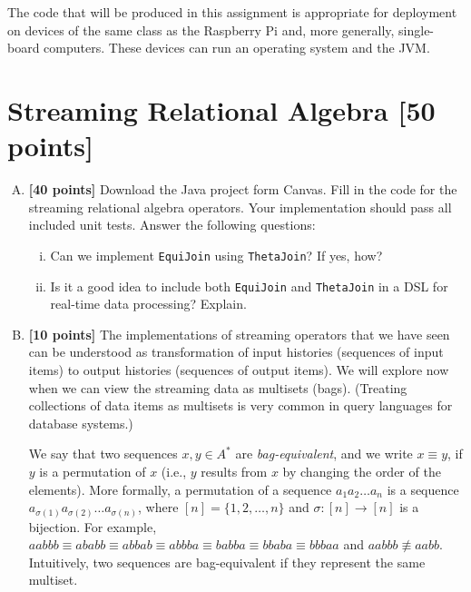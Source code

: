 \documentclass[11pt]{article}
\newcommand{\eq}{\equiv}
\newcommand{\kstar}{^{\textstyle *}}
\begin{document}
The code that will be produced in this assignment is appropriate for deployment on devices of the same class as the Raspberry Pi and, more generally, single-board computers. These devices can run an operating system and the JVM.


\section{Streaming Relational Algebra [50 points]}

\begin{enumerate}[(A)]
\item
\textbf{[40 points]}
Download the Java project form Canvas. Fill in the code for the streaming relational algebra operators. Your implementation should pass all included unit tests. Answer the following questions:
\begin{enumerate}[(i)]
\item
Can we implement \texttt{EquiJoin} using \texttt{ThetaJoin}? If yes, how?
\item
Is it a good idea to include both \texttt{EquiJoin} and \texttt{ThetaJoin} in a DSL for real-time data processing? Explain.
\end{enumerate}
\item
\textbf{[10 points]}
The implementations of streaming operators that we have seen can be understood as transformation of input histories (sequences of input items) to output histories (sequences of output items). We will explore now when we can view the streaming data as multisets (bags). (Treating collections of data items as multisets is very common in query languages for database systems.)

We say that two sequences $x, y \in A\kstar$ are \emph{bag-equivalent}, and we write $x \eq y$, if $y$ is a permutation of $x$ (i.e., $y$ results from $x$ by changing the order of the elements).
%
More formally, a permutation of a sequence $a_1 a_2 \ldots a_n$ is a sequence $a_{\sigma(1)} a_{\sigma(2)} \ldots a_{\sigma(n)}$, where $[n] = \{ 1, 2, \ldots, n \}$ and $\sigma: [n] \to [n]$ is a bijection.
%
For example, $aabbb \eq ababb \eq abbab \eq abbba \eq babba \eq bbaba \eq bbbaa$ and $aabbb \not\eq aabb$. Intuitively, two sequences are bag-equivalent if they represent the same multiset.


\end{enumerate}
\end{document}
